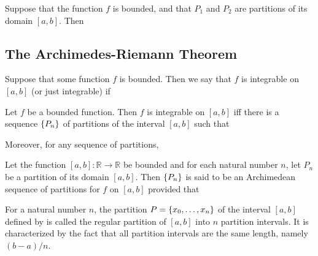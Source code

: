     \begin{thm}
        Suppose that the function $f$ is bounded, and that $P_1$ and $P_2$ are partitions of its domain $[a, b]$. Then
    \end{thm}

    \subsection{The Archimedes-Riemann Theorem}

    \begin{definition}
        Suppose that some function $f$ is bounded. Then we say that $f$ is integrable on $[a, b]$ (or just integrable)
        if
    \end{definition}

    \begin{thm}
        Let $f$ be a bounded function. Then $f$ is integrable on $[a, b]$ iff there is a sequence ${\left\{ P_n \right\}}$ of
        partitions of the interval $[a, b]$ such that

        Moreover, for any sequence of partitions,
    \end{thm}

    \begin{definition}
        Let the function $[a, b]:\mathbb{R}\to\mathbb{R}$ be bounded and for each natural number $n$, let $P_n$ be a
        partition of its domain $[a, b]$. Then ${\left\{ P_n \right\}}$ is said to be an Archimedean sequence of partitions for $f$
        on $[a, b]$ provided that
    \end{definition}

    \begin{definition}
        For a natural number $n$, the partition $P={\left\{ x_0, \ldots, x_n \right\}}$ of the interval $[a, b]$ defined by
        is called the regular partition of $[a, b]$ into $n$ partition intervals. It is characterized by the fact that
        all partition intervals are the same length, namely $(b - a) / n$.
    \end{definition}

